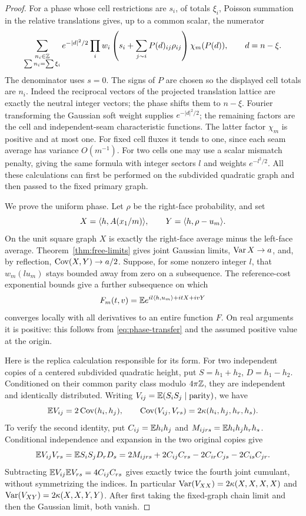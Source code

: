 \begin{proof}
For a phase whose cell restrictions are \(s_i\), of totals
\(\xi_i\), Poisson summation in the relative translations gives,
up to a common scalar, the numerator
\begin{equation}
 \sum_{\substack{n_i\in\mathbb Z\\\sum n_i=\sum\xi_i}}
 e^{-|d|^2/2}
 \prod_i w_i\left(s_i+\sum_{j\sim i}P(d)_{ij}\rho_{ij}\right)
 \chi_m(P(d)),\qquad d=n-\xi.
 \label{eq:soft-fourier}
\end{equation}
The denominator uses \(s=0\). The signs of \(P\) are chosen so
the displayed cell totals are \(n_i\).
Indeed the reciprocal vectors of the projected translation
lattice are exactly the neutral integer vectors; the phase
shifts them to \(n-\xi\). Fourier transforming the Gaussian
soft weight supplies \(e^{-|d|^2/2}\); the remaining factors
are the cell and independent-seam characteristic functions.
The latter factor \(\chi_m\) is positive and at most one.
For fixed cell fluxes it tends to one, since each seam average
has variance \(O(m^{-1})\).
For two cells one may use a scalar mismatch penalty, giving the
same formula with integer sectors \(l\) and weights \(e^{-l^2/2}\).
All these calculations can first be performed on the subdivided
quadratic graph and then passed to the fixed primary graph.

We prove the uniform phase. Let \(\rho\) be the right-face
probability, and set
\[
 X=\langle h,A(x_1/m)\rangle,\qquad
 Y=\langle h,\rho-u_m\rangle.
\]
On the unit square graph \(X\) is exactly the right-face average
minus the left-face average. Theorem~\ref{thm:free-limits} gives
joint Gaussian limits, \(\operatorname{Var} X\to a\), and, by reflection,
\(\operatorname{Cov}(X,Y)\to a/2\).
Suppose, for some nonzero integer \(l\), that
\(w_m(lu_m)\) stays bounded away from zero on a subsequence.
The reference-cost exponential bounds give a further subsequence
on which
\[
 F_m(t,v)=\mathbb E e^{il\langle h,u_m\rangle+itX+ivY}
\]
converges locally with all derivatives to an entire function
\(F\). On real arguments it is positive: this follows from
\eqref{eq:phase-transfer} and the assumed positive value at the
origin.

Here is the replica calculation responsible for its form.
For two independent copies of a centered subdivided quadratic
height, put \(S=h_1+h_2\), \(D=h_1-h_2\).
Conditioned on their common parity class modulo \(4\pi\mathbb Z\),
they are independent and identically distributed.
Writing \(V_{ij}=\mathbb E(S_iS_j\mid\text{parity})\), we have
\begin{equation}
 \mathbb E V_{ij}=2\operatorname{Cov}(h_i,h_j),\qquad
 \operatorname{Cov}(V_{ij},V_{rs})=2\kappa(h_i,h_j,h_r,h_s).
 \label{eq:replica}
\end{equation}
To verify the second identity, put \(C_{ij}=\mathbb E h_ih_j\) and
\(M_{ijrs}=\mathbb E h_ih_jh_rh_s\).
Conditional independence and expansion in the two original copies
give
\[
 \mathbb E V_{ij}V_{rs}
 =\mathbb E S_iS_jD_rD_s
 =2M_{ijrs}+2C_{ij}C_{rs}
             -2C_{ir}C_{js}-2C_{is}C_{jr}.
\]
Subtracting \(\mathbb E V_{ij}\mathbb E V_{rs}=4C_{ij}C_{rs}\) gives exactly
twice the fourth joint cumulant, without symmetrizing the indices.
In particular
\(\operatorname{Var}(V_{XX})=2\kappa(X,X,X,X)\) and
\(\operatorname{Var}(V_{XY})=2\kappa(X,X,Y,Y)\).
After first taking the fixed-graph chain limit and then the
Gaussian limit, both vanish.


\end{proof}
